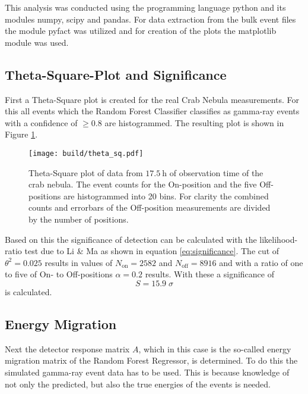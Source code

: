        This analysis was conducted using the programming language python and its modules numpy\cite{numpy}, scipy\cite{scipy} and pandas\cite{pandas}.
        For data extraction from the bulk event files the module pyfact was utilized and for creation of the plots the matplotlib\cite{matplotlib} module was used.
        \subsection{Theta-Square-Plot and Significance}
            First a Theta-Square plot is created for the real Crab Nebula measurements.
            For this all events which the Random Forest Classifier classifies as gamma-ray events with a confidence of $\geq \num{0.8}$ are histogrammed.
            The resulting plot is shown in Figure \ref{fig:theta_sq}.
            \begin{figure}
                \centering
                \texttt{[image: build/theta\_sq.pdf]}
                \caption{
                    Theta-Square plot of data from $\SI{17.5}{\hour}$ of observation time of the crab nebula.
                    The event counts for the On-position and the five Off-positions are histogrammed into 20 bins.
                    For clarity the combined counts and errorbars of the Off-position measurements are divided by the number of positions.
                }
                \label{fig:theta_sq}
            \end{figure}
            
            Based on this the significance of detection can be calculated with the likelihood-ratio test due to Li \& Ma \cite{} as shown in equation \eqref{eq:significance}.
            The cut of $\theta^2 = \num{0.025}$ results in values of $N_\text{on} = 2582$ and $N_\text{off} = 8916$ and with a ratio of one to five of On- to Off-positions $\alpha = \num{0.2}$ results.
            With these a significance of
            \begin{equation}
                S = \num{15.9} \; \sigma
            \end{equation}
            is calculated.
            

        
        \subsection{Energy Migration}
            Next the detector response matrix $A$, which in this case is the so-called energy migration matrix of the Random Forest Regressor, is determined.
            To do this the simulated gamma-ray event data has to be used.
            This is because knowledge of not only the predicted, but also the true energies of the events is needed.
            
